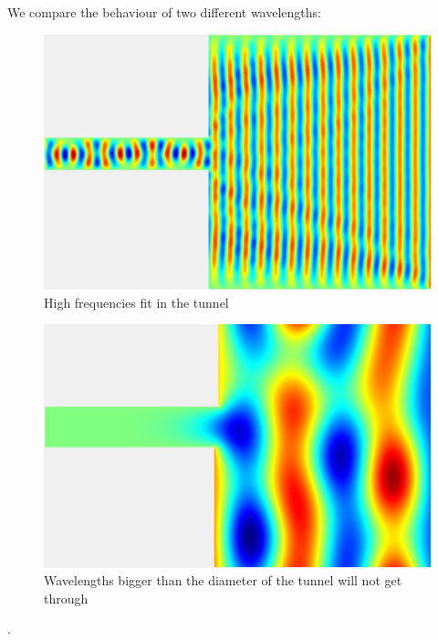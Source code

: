 \documentclass{article}
\begin{document}
We compare the behaviour of two different wavelengths:




\begin{figure}
  \includegraphics[width=\linewidth]{highfreq.gif}
  \caption{High frequencies fit in the tunnel}
\end{figure}


\begin{figure}
  \includegraphics[width=\linewidth]{lowfreq.gif}
  \caption{Wavelengths bigger than the diameter of the tunnel will not get through}
\end{figure}.
\end{document}
